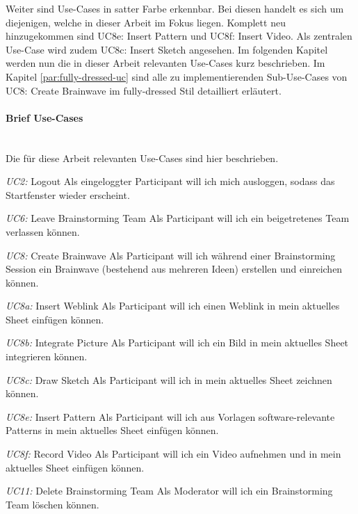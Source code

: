 Weiter sind Use-Cases in satter Farbe erkennbar. Bei diesen handelt es sich um diejenigen, welche in dieser Arbeit im Fokus liegen. Komplett neu hinzugekommen sind UC8e: Insert Pattern und UC8f: Insert Video. Als zentralen Use-Case wird zudem UC8c: Insert Sketch angesehen. Im folgenden Kapitel werden nun die in dieser Arbeit relevanten Use-Cases kurz beschrieben. Im Kapitel \ref{par:fully-dressed-uc} sind alle zu implementierenden Sub-Use-Cases von UC8: Create Brainwave im fully-dressed Stil detailliert erläutert.
\paragraph{Brief Use-Cases}~\\
Die für diese Arbeit relevanten Use-Cases sind hier beschrieben.

\begin{basedescript}{
		\desclabelstyle{\multilinelabel}
		\desclabelwidth{4.5cm}
		\setlength{\itemsep}{5ex}}
	
	\item[\textit{UC2: }Logout] Als eingeloggter Participant will ich mich ausloggen, sodass das Startfenster wieder erscheint.
	
	\item[\textit{UC6: }Leave Brainstorming Team] Als Participant will ich ein beigetretenes Team verlassen können.
		
	\item[\textit{UC8: }Create Brainwave] Als Participant will ich während einer Brainstorming Session ein Brainwave (bestehend aus mehreren Ideen) erstellen und einreichen können. 
	
	\item[\textit{UC8a: }Insert Weblink] Als Participant will ich einen Weblink in mein aktuelles Sheet einfügen können.
	
	\item[\textit{UC8b: }Integrate Picture] Als Participant will ich ein Bild in mein aktuelles Sheet integrieren können.
	
	\item[\textit{UC8c: }Draw Sketch] Als Participant will ich in mein aktuelles Sheet zeichnen können.
	
	\item[\textit{UC8e: }Insert Pattern] Als Participant will ich aus Vorlagen software-relevante Patterns in mein aktuelles Sheet einfügen können.
	
	\item[\textit{UC8f: }Record Video] Als Participant will ich ein Video aufnehmen und in mein aktuelles Sheet einfügen können.
	
	\item[\textit{UC11: }Delete Brainstorming Team] Als Moderator will ich ein Brainstorming Team löschen können.
\end{basedescript}
\vspace{1cm}

